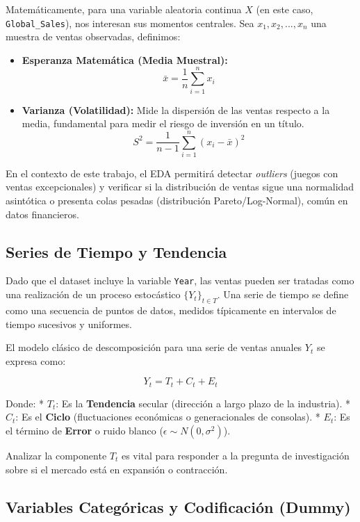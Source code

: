 \documentclass[oneside,11pt]{Latex/Classes/PhDthesisPSnPDF}
\begin{document}
Matemáticamente, para una variable aleatoria continua \(X\) (en este
caso, \texttt{Global\_Sales}), nos interesan sus momentos centrales. Sea
\(x_1, x_2, ..., x_n\) una muestra de ventas observadas, definimos:

\begin{itemize}
\item
  \textbf{Esperanza Matemática (Media Muestral):}
  \[\bar{x} = \frac{1}{n} \sum_{i=1}^{n} x_i\]
\item
  \textbf{Varianza (Volatilidad):} Mide la dispersión de las ventas
  respecto a la media, fundamental para medir el riesgo de inversión en
  un título. \[S^2 = \frac{1}{n-1} \sum_{i=1}^{n} (x_i - \bar{x})^2\]
\end{itemize}

En el contexto de este trabajo, el EDA permitirá detectar
\emph{outliers} (juegos con ventas excepcionales) y verificar si la
distribución de ventas sigue una normalidad asintótica o presenta colas
pesadas (distribución Pareto/Log-Normal), común en datos financieros.

\subsection{Series de Tiempo y Tendencia}

Dado que el dataset incluye la variable \texttt{Year}, las ventas pueden
ser tratadas como una realización de un proceso estocástico
\(\{Y_t\}_{t \in T}\). Una serie de tiempo se define como una secuencia
de puntos de datos, medidos típicamente en intervalos de tiempo
sucesivos y uniformes.

El modelo clásico de descomposición para una serie de ventas anuales
\(Y_t\) se expresa como:

\[Y_t = T_t + C_t + E_t\]

Donde: * \(T_t\): Es la \textbf{Tendencia} secular (dirección a largo
plazo de la industria). * \(C_t\): Es el \textbf{Ciclo} (fluctuaciones
económicas o generacionales de consolas). * \(E_t\): Es el término de
\textbf{Error} o ruido blanco (\(\epsilon \sim N(0, \sigma^2)\)).

Analizar la componente \(T_t\) es vital para responder a la pregunta de
investigación sobre si el mercado está en expansión o contracción.

\subsection{Variables Categóricas y Codificación (Dummy)}
\end{document}
